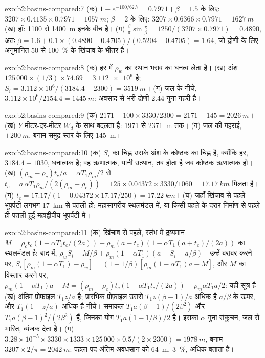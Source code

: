 \begin{solution}{exo:b2:basins-compared:7}
(क) $1 - e^{-100/62.7} = 0.7971$। $\beta = 1.5$ के लिए: $3207\times0.4135\times0.7971 =
\qty{1057}{m}$; $\beta = 2$ के लिए: $3207\times0.6366\times0.7971 = \qty{1627}{m}$। (ख) हाँ: 1100 से
\qty{1400}{m} इनके बीच है। (ग) $\frac{\beta}{\pi}\sin\frac{\pi}{\beta} = 1250/(3207\times0.7971)
= 0.4890$, अतः $\beta = 1.6 + 0.1\times(0.4890 - 0.4705)/(0.5204 - 0.4705) = 1.64$, जो द्रोणी के लिए अनुमानित
50 से \qty{100}{\percent} के खिंचाव के भीतर है।
\end{solution}

\begin{solution}{exo:b2:basins-compared:8}
(क) हर में $\rho_w$ का स्थान भराव का घनत्व लेता है। (ख) अंश
$125\,000\times(1/3)\times74.69 = \num{3.112e6}$ है; $S_i = 3.112\times10^{6}/(3184.4 - 2300) =
\qty{3519}{m}$। (ग) जल के नीचे, $3.112\times10^{6}/2154.4 = \qty{1445}{m}$: अवसाद से भरी
द्रोणी 2.44 गुना गहरी है।
\end{solution}

\begin{solution}{exo:b2:basins-compared:9}
(क) $2171 - 100\times3330/2300 = 2171 - 145 = \qty{2026}{m}$। (ख) $Y$ मीटर-दर-मीटर
$W_d$ के साथ बदलता है: 1971 से \qty{2371}{m} तक। (ग) जल की गहराई, $\pm\qty{200}{m}$, बनाम
समुद्र-स्तर के लिए \qty{145}{m}।
\end{solution}

\begin{solution}{exo:b2:basins-compared:10}
(क) $S_i$ का चिह्न उसके अंश के कोष्ठक का चिह्न है, क्योंकि हर, $3184.4 - 1030$,
धनात्मक है; वह ऋणात्मक, यानी उत्थान, तब होता है जब कोष्ठक ऋणात्मक हो। (ख) $(\rho_m - \rho_c)t_c/a =
\alpha T_1\rho_m/2$ से $t_c = a\,\alpha T_1\rho_m/(2(\rho_m - \rho_c)) = 125\times0.04372\times
3330/1060 = \qty{17.17}{km}$ मिलता है। (ग) $t_c = 17.17/(1 - 0.04372\times17.17/250) = \qty{17.22}{km}$।
(घ) जहाँ खिंचाव से पहले भूपर्पटी लगभग \qty{17}{km} से पतली हो: महासागरीय स्थलमंडल में,
या किसी पहले के दरार-निर्माण से पहले ही पतली हुई महाद्वीपीय भूपर्पटी में।
\end{solution}

\begin{solution}{exo:b2:basins-compared:11}
(क) खिंचाव से पहले, स्तंभ में द्रव्यमान $M = \rho_c t_c(1 - \alpha T_1
t_c/(2a)) + \rho_m(a - t_c)(1 - \alpha T_1(a + t_c)/(2a))$ का स्थलमंडल है; बाद में, $\rho_w S_i + M/\beta +
\rho_m(1 - \alpha T_1)(a - S_i - a/\beta)$। उन्हें बराबर करने पर, $S_i[\rho_m(1 - \alpha T_1) - \rho_w] =
(1 - 1/\beta)[\rho_m(1 - \alpha T_1)a - M]$, और $M$ का विस्तार करने पर, $\rho_m(1 - \alpha T_1)a - M =
(\rho_m - \rho_c)t_c(1 - \alpha T_1 t_c/(2a)) - \rho_m\alpha T_1 a/2$: यही सूत्र है। (ख) अंतिम प्रोफ़ाइल $T_1 z/a$ है; प्रारंभिक प्रोफ़ाइल उससे
$T_1 z(\beta - 1)/a$ अधिक है $a/\beta$ के ऊपर, और $T_1(1 - z/a)$ अधिक है नीचे। समाकल $T_1
a(\beta - 1)/(2\beta^2)$ और $T_1 a(\beta - 1)^2/(2\beta^2)$ हैं, जिनका योग $T_1 a(1 - 1/\beta)/2$ है।
इसका $\alpha$ गुना संकुचन, जल से भारित, व्यंजक देता है। (ग) $3.28\times10^{-5}
\times3330\times1333\times125\,000\times0.5/(2\times2300) = \qty{1978}{m}$, बनाम $3207\times
2/\pi = \qty{2042}{m}$: पहला पद अंतिम अवधसान को \qty{64}{m},
\qty{3}{\percent}, अधिक बताता है।
\end{solution}

